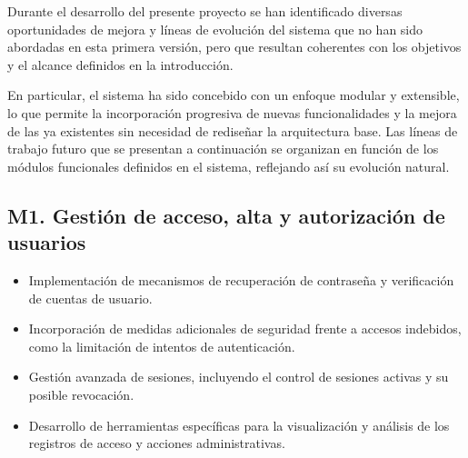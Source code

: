 Durante el desarrollo del presente proyecto se han identificado diversas oportunidades de mejora y líneas de evolución del sistema que no han sido abordadas en esta primera versión, pero que resultan coherentes con los objetivos y el alcance definidos en la introducción.

En particular, el sistema ha sido concebido con un enfoque modular y extensible, lo que permite la incorporación progresiva de nuevas funcionalidades y la mejora de las ya existentes sin necesidad de rediseñar la arquitectura base. Las líneas de trabajo futuro que se presentan a continuación se organizan en función de los módulos funcionales definidos en el sistema, reflejando así su evolución natural.

\subsection*{M1. Gestión de acceso, alta y autorización de usuarios}
\begin{itemize}
    \item Implementación de mecanismos de recuperación de contraseña y verificación de cuentas de usuario.
    \item Incorporación de medidas adicionales de seguridad frente a accesos indebidos, como la limitación de intentos de autenticación.
    \item Gestión avanzada de sesiones, incluyendo el control de sesiones activas y su posible revocación.
    \item Desarrollo de herramientas específicas para la visualización y análisis de los registros de acceso y acciones administrativas.
\end{itemize}